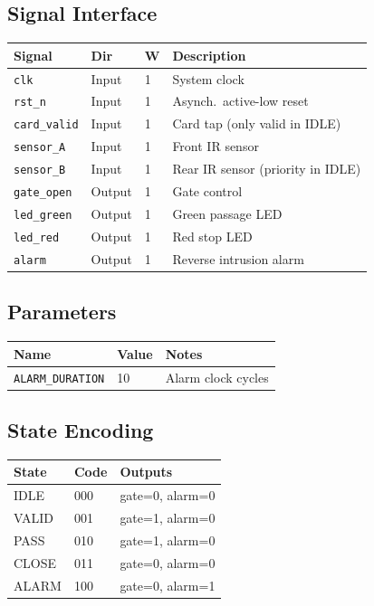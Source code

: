 \documentclass[12pt,a4paper]{ctexart}
\begin{document}
\subsection*{Signal Interface}
\begin{tabular}{llll}
\toprule
\textbf{Signal} & \textbf{Dir} & \textbf{W} & \textbf{Description} \\
\midrule
\texttt{clk}       & Input  & 1 & System clock \\
\texttt{rst\_n}    & Input  & 1 & Asynch.\ active-low reset \\
\texttt{card\_valid} & Input  & 1 & Card tap (only valid in IDLE) \\
\texttt{sensor\_A} & Input  & 1 & Front IR sensor \\
\texttt{sensor\_B} & Input  & 1 & Rear IR sensor (priority in IDLE) \\
\texttt{gate\_open} & Output & 1 & Gate control \\
\texttt{led\_green} & Output & 1 & Green passage LED \\
\texttt{led\_red}   & Output & 1 & Red stop LED \\
\texttt{alarm}     & Output & 1 & Reverse intrusion alarm \\
\bottomrule
\end{tabular}

\subsection*{Parameters}
\begin{tabular}{lll}
\toprule
\textbf{Name} & \textbf{Value} & \textbf{Notes} \\
\midrule
\texttt{ALARM\_DURATION} & 10 & Alarm clock cycles \\
\bottomrule
\end{tabular}

\subsection*{State Encoding}
\begin{tabular}{lll}
\toprule
\textbf{State} & \textbf{Code} & \textbf{Outputs} \\
\midrule
IDLE  & 000 & gate=0, alarm=0 \\
VALID & 001 & gate=1, alarm=0 \\
PASS  & 010 & gate=1, alarm=0 \\
CLOSE & 011 & gate=0, alarm=0 \\
ALARM & 100 & gate=0, alarm=1 \\
\bottomrule
\end{tabular}
\end{document}
